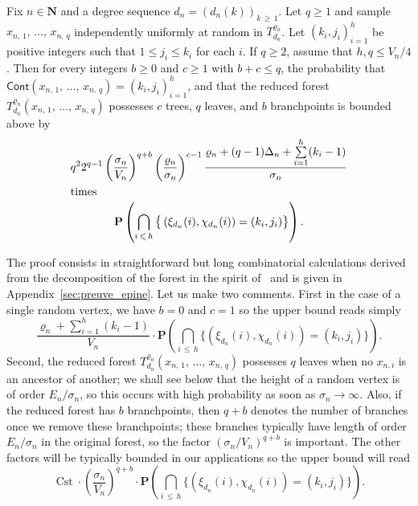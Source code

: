 \documentclass[AHL,Unicode,longabstracts,published]{cedram}
\newcommand{\ensembles}[1]{\mathbf{#1}}
\newcommand{\N}{\ensembles{N}}
\renewcommand{\P}{\ensembles{P}}
\renewcommand{\Pr}[1]{\P\left(#1\right)}
\newcommand{\1}{\ensembles{1}}
\renewcommand{\le}{\leqslant}
\renewcommand{\ge}{\geqslant}
\newcommand{\Cont}{\mathsf{Cont}}
\DeclareMathOperator{\Cst}{Cst}
\newcommand{\fn}{T_{d_n}^{\varrho_n}}
\newcommand{\edges}{E}
\newcommand{\vertices}{V}
\begin{document}
\begin{lemm}\label{lem:multi_epines_sans_remise}
Fix $n \in \N$ and a degree sequence $d_n = (d_n(k))_{k\,\ge\,1}$. Let $q \ge 1$ and sample $x_{n,\,1},\,\dots,\, x_{n,\,q}$ independently uniformly at random in $\fn$. Let $(k_i, j_i)_{i=1}^h$ be positive integers such that $1 \le j_i \le k_i$ for each $i$. If $q \ge 2$, assume that $h, q \le \vertices_n/4$. Then for every integers $b \ge 0$ and $c \ge 1$ with $b+c \le q$, the probability that $\Cont(x_{n,\,1},\,\dots,\,x_{n,\,q}) = (k_i, j_i)_{i=1}^h$, and that the reduced forest ${T}_{d_n}^{\varrho_n}(x_{n,\,1},\,\dots,\,x_{n,\,q})$ possesses $c$ trees, $q$ leaves, and $b$ branchpoints is bounded above by
\begin{gather*}
q^2 2^{q - 1} \left(\frac{\sigma_n}{\vertices_n}\right)^{q + b} \left(\frac{\varrho_n}{\sigma_n}\right)^{c-1} \frac{\varrho_n + (q-1) \Delta_n + \sum\limits_{i=1}^h (k_i - 1)}{\sigma_n}
\\
\intertext{times}
\P\left(\bigcap_{i\,\le\,h} \big\{\left(\xi_{d_n}(i), \chi_{d_n}(i)\right) = (k_i, j_i)\big\}\right).
\end{gather*}
\end{lemm}

The proof consists in straightforward but long combinatorial calculations derived from the decomposition of the forest in the spirit of~\cite{BM14} and is given in Appendix~\ref{sec:preuve_epine}. Let us make two comments. First in the case of a single random vertex, we have $b=0$ and $c=1$ so the upper bound reads simply
\begin{equation}\label{eq:epine_un_sommet}
\frac{\varrho_n + \sum\limits_{i=1}^h (k_i - 1)}{\vertices_n}
\cdot \Pr{\bigcap_{i\,\le\,h} \big\{\left(\xi_{d_n}(i), \chi_{d_n}(i)\right) = \left(k_i, j_i\right)\big\}}.
\end{equation}
Second, the reduced forest ${T}_{d_n}^{\varrho_n}(x_{n,\,1},\,\dots,\,x_{n,\,q})$ possesses $q$ leaves when no $x_{n,i}$ is an ancestor of another; we shall see below that the height of a random vertex is of order $\edges_n / \sigma_n$, so this occurs with high probability as soon as $\sigma_n \to \infty$. Also, if the reduced forest has $b$ branchpoints, then $q+b$ denotes the number of branches once we remove these branchpoints; these branches typically have length of order $\edges_n/\sigma_n$ in the original forest, so the factor $(\sigma_n/\vertices_n)^{q+b}$ is important. The other factors will be typically bounded in our applications so the upper bound will read
\[
\Cst \cdot \left(\frac{\sigma_n}{\vertices_n}\right)^{q + b} \cdot \Pr{\bigcap_{i\,\le\,h} \big\{\left(\xi_{d_n}(i), \chi_{d_n}(i)\right) = \left(k_i, j_i\right)\big\}}.
\]
\end{document}
